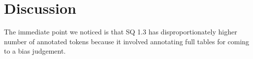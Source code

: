 \documentclass[sn-mathphys,Numbered]{sn-jnl}%
\theoremstyle{thmstyleone}%
\theoremstyle{thmstyletwo}%
\theoremstyle{thmstylethree}%
\begin{document}
%
%
%
%
%
%
\section{Discussion}
\label{sec:discussion}
%
%
%
The immediate point we noticed is that SQ 1.3 has disproportionately higher number of annotated tokens because it involved annotating full tables for coming to a bias judgement.
\end{document}

